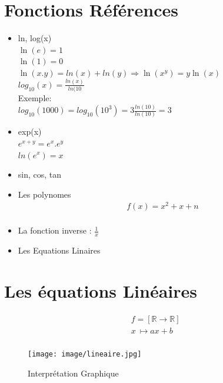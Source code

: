 \documentclass[10pt,a4paper]{article}
\newcommand{\reels}{\mathbb{R}}
\begin{document}
\section{Fonctions Références}
\begin{itemize}
 \item ln, log(x)\\
 $\ln(e)=1$\\
$\ln(1)=0$\\
$\ln(x.y)=ln(x)+ln(y)\Rightarrow\ln(x^y)=y\ln(x)$\\
 
$log_{10}(x)=\frac{ln(x)}{ln(10}$\\
Exemple:\\
$log_{10}(1000)=log_{10}(10^3)=3\frac{ln(10)}{ln(10)}=3$\\
 
 \item exp(x)\\
$e^{x+y}=e^x.e^y$\\
$ln(e^x)=x$ 
 \item sin, cos, tan
 \item Les polynomes \\
\begin{equation}\label{xx}
\begin{split}
&f(x)=x^2+x+n\\
\end{split}
\end{equation}
\item La fonction inverse : $\frac{1}{x}$
\item Les Equations Linaires
\end{itemize}





\section{Les équations Linéaires}
 \begin{equation}\label{xx}
\begin{split}
&f = [ \reels\rightarrow\reels] \\
&x\ \mapsto ax+b \\
\end{split}
\end{equation}
\begin{figure}[h!]
\centering
\texttt{[image: image/lineaire.jpg]}
\caption{Interprétation Graphique}
\label{fig:net}
\end{figure}
\end{document}
